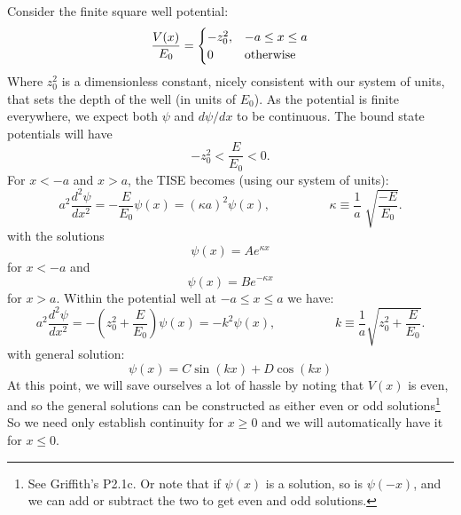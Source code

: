 \documentclass[12pt]{article}
\begin{document}
Consider the finite square well potential:
$$\frac{V(x)}{E_0} = \begin{cases}
-z_0^2, & -a \leq x \leq a \\
0     & {\rm otherwise} \\
\end{cases}
$$
Where $z_0^2$ is a dimensionless constant, nicely consistent with our system of units, that sets the depth of the well (in units of $E_0$). As the potential is finite everywhere, we expect both $\psi$ and $d\psi/dx$ to be continuous.
The bound state potentials will have 
$$-z_0^2 < \frac{E}{E_0} < 0.$$
For $x < -a$ and $x > a$, the TISE becomes (using our system of units):
\begin{equation*}
a^2 \frac{d^2 \psi}{d x^2} = -\frac{E}{E_0}\psi(x) = 
(\kappa a)^2 \psi(x), \hspace{2cm} \kappa \equiv \frac{1}{a} \; \sqrt{\frac{-E}{E_0}}.
\end{equation*}
with the solutions
$$\psi(x) = A e^{\displaystyle \kappa x}$$
for $x<-a$ and
$$\psi(x) = B e^{\displaystyle -\kappa x}$$
for $x>a$.  Within the potential well at $-a \leq x \leq a$ we have:
\begin{equation*}
a^2 \frac{d^2 \psi}{d x^2} = -\left(z_0^2+\frac{E}{E_0}\right)\psi(x) = -k^2 \psi(x), \hspace{2cm} k \equiv \frac{1}{a}\sqrt{z_0^2+\frac{E}{E_0}}.
\end{equation*}
with general solution:
$$\psi(x) = C \sin(kx) + D \cos(kx)$$
At this point, we will save ourselves a lot of hassle by noting that $V(x)$ is even, and so the general solutions can be constructed as either even or odd solutions\footnote{See Griffith's P2.1c.  Or note that if $\psi(x)$ is a solution, so is $\psi(-x)$, and we can add or subtract the two to get even and odd solutions.}  So we need only establish continuity for $x \geq 0$ and we will automatically have it for $x \leq 0$.
\end{document}
